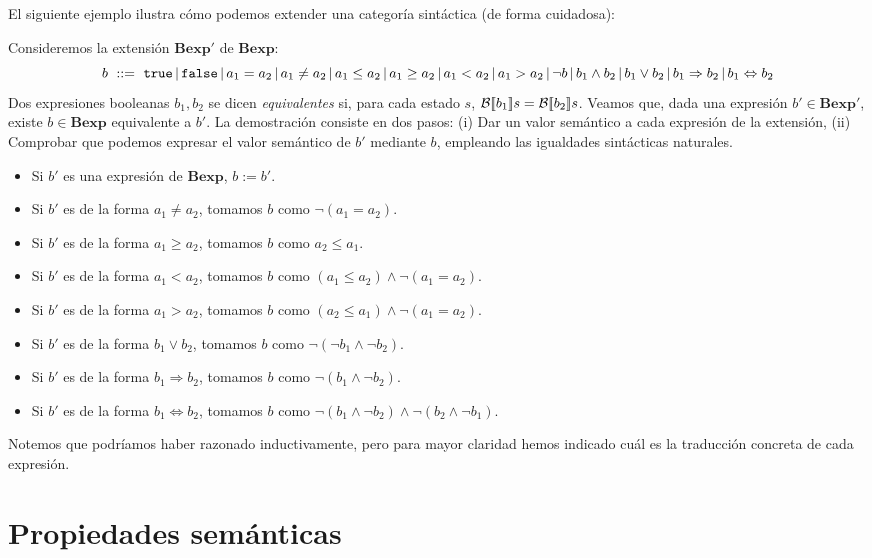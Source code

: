 El siguiente ejemplo ilustra cómo podemos extender una categoría sintáctica (de forma cuidadosa):
\begin{example}
Consideremos la extensión $\mathbf{Bexp}'$ de $\mathbf{Bexp}$:
$$b \,\, ::= \, \, \texttt{true} \, | \, \texttt{false} \, | \, a_1 = a_2 \, | \, a_1 \neq a_2 \, | \, a_1 \leq a_2 \, | \, a_1 \geq a_2 \, | \, a_1 < a_2 \, | \, a_1 > a_2 \, | \, \neg b \, | \, b_1 \land b_2 \, | \, b_1 \lor b_2 \, | \, b_1 \Rightarrow b_2 \, | \, b_1\Leftrightarrow b_2$$
Dos expresiones booleanas $b_1, b_2$ se dicen \textit{equivalentes} si, para cada estado $s$, $\mathcal{B}[\![b_1]\!]s = \mathcal{B}[\![b_2]\!]s$. Veamos que, dada una expresión $b' \in \mathbf{Bexp}'$, existe $b \in \mathbf{Bexp}$ equivalente a $b'$. La demostración consiste en dos pasos: (i) Dar un valor semántico a cada expresión de la extensión, (ii) Comprobar que podemos expresar el valor semántico de $b'$ mediante $b$, empleando las igualdades sintácticas naturales.
\begin{itemize}
    \item Si $b'$ es una expresión de $\mathbf{Bexp}$, $b := b'$.
    \item Si $b'$ es de la forma $a_1 \neq a_2$, tomamos $b$ como $\neg(a_1 = a_2)$.
    \item Si $b'$ es de la forma $a_1 \geq a_2$, tomamos $b$ como $a_2 \leq a_1$.
    \item Si $b'$ es de la forma $a_1 < a_2$, tomamos $b$ como $(a_1 \leq a_2)\land \neg(a_1 = a_2)$.
    \item Si $b'$ es de la forma $a_1 > a_2$, tomamos $b$ como $(a_2 \leq a_1)\land \neg(a_1 = a_2)$.
    \item Si $b'$ es de la forma $b_1 \lor b_2$, tomamos $b$ como $\neg(\neg b_1 \land \neg b_2)$.
    \item Si $b'$ es de la forma $b_1 \Rightarrow b_2$, tomamos $b$ como $\neg(b_1 \land \neg b_2)$.
    \item Si $b'$ es de la forma $b_1 \Leftrightarrow b_2$, tomamos $b$ como $\neg(b_1 \land \neg b_2) \land \neg(b_2 \land \neg b_1)$.
\end{itemize}
Notemos que podríamos haber razonado inductivamente, pero para mayor claridad hemos indicado cuál es la traducción concreta de cada expresión.
\end{example}

\section{Propiedades semánticas}

